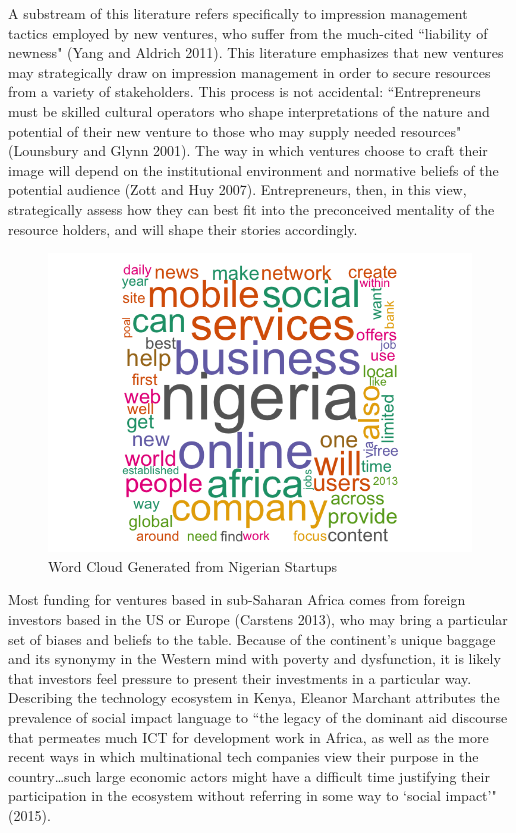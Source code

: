 \documentclass[12pt]{article}
\begin{document}
A substream of this literature refers specifically to impression management tactics employed by new ventures, who suffer from the much-cited ``liability of newness" (Yang and Aldrich 2011). This literature emphasizes that new ventures may strategically draw on impression management in order to secure resources from a variety of stakeholders. This process is not accidental: ``Entrepreneurs must be skilled cultural operators who shape interpretations of the nature and potential of their new venture to those who may supply needed resources" (Lounsbury and Glynn 2001). The way in which ventures choose to craft their image will depend on the institutional environment and normative beliefs of the potential audience (Zott and Huy 2007). Entrepreneurs, then, in this view, strategically assess how they can best fit into the preconceived mentality of the resource holders, and will shape their stories accordingly.

\begin{figure} [!h]
\centering
\includegraphics[scale=0.4]{nigeria_cloud}
\caption{Word Cloud Generated from Nigerian Startups}
\end{figure}

Most funding for ventures based in sub-Saharan Africa comes from foreign investors based in the US or Europe (Carstens 2013), who may bring a particular set of biases and beliefs to the table. Because of the continent’s unique baggage and its synonymy in the Western mind with poverty and dysfunction, it is likely that investors feel pressure to present their investments in a particular way. Describing the technology ecosystem in Kenya, Eleanor Marchant attributes the prevalence of social impact language to ``the legacy of the dominant aid discourse that permeates much ICT for development work in Africa, as well as the more recent ways in which multinational tech companies view their purpose in the country…such large economic actors might have a difficult time justifying their participation in the ecosystem without referring in some way to ‘social impact’" (2015).
\end{document}
